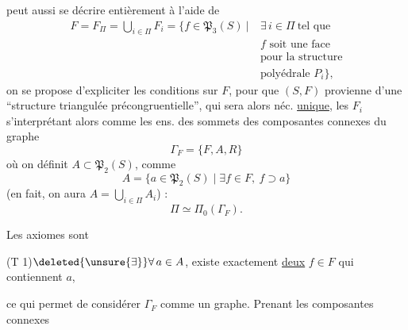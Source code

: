 
peut aussi se décrire entièrement à l'aide de
\[
\begin{aligned}
F=F_\Pi=\bigcup_{i\in\Pi}F_i=\bigl\{f\in\mathfrak P_3(S)\ \big|\ &\exists\,i\in\Pi\ \text{tel que}\\
& f\text{ soit une face}\\
&\text{pour la structure}\\
&\text{polyédrale }P_i\bigr\},
\end{aligned}\tag*{(20)}
\]
on se propose d'expliciter les conditions sur $F$, pour que $(S,F)$ provienne d'une ``structure triangulée précongruentielle'', qui sera alors néc. \uline{unique}, les $F_i$ s'interprétant alors comme les ens. des sommets des composantes connexes du graphe
\[
\Gamma_F=\{F,A,R\}\tag*{(21)}
\]
où on définit $A\subset\mathfrak P_2(S)$,  comme
\[
A=\{a\in\mathfrak P_2(S)\mid\exists f\in F,\ f\supset a\}\tag*{(22)}
\]
(en fait, on aura $A=\bigcup_{i\in\Pi}A_i$) :
\[
\Pi\simeq\Pi_0(\Gamma_F).\tag*{(23)}
\]

Les axiomes sont


(T 1)\qquad $\deleted{\unsure{\exists}}\forall\,a\in A$, existe exactement \uline{deux} $f\in F$ qui contiennent $a$,

ce qui permet de considérer $\Gamma_F$ comme un graphe. Prenant les composantes connexes

